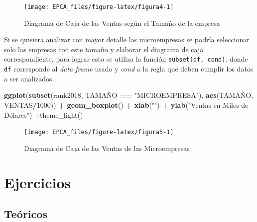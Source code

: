 \documentclass[letterpaper,]{book}
\newenvironment{Shaded}{\begin{snugshade}}{\end{snugshade}}
\newcommand{\DecValTok}[1]{\textcolor[rgb]{0.00,0.00,0.81}{#1}}
\newcommand{\KeywordTok}[1]{\textcolor[rgb]{0.13,0.29,0.53}{\textbf{#1}}}
\newcommand{\NormalTok}[1]{#1}
\newcommand{\OperatorTok}[1]{\textcolor[rgb]{0.81,0.36,0.00}{\textbf{#1}}}
\newcommand{\StringTok}[1]{\textcolor[rgb]{0.31,0.60,0.02}{#1}}
\begin{document}
\begin{figure}[h!]

{\centering \texttt{[image: EPCA\_files/figure-latex/figura4-1]} 

}

\caption{Diagrama de Caja de las Ventas según el Tamaño de la empresa}\label{fig:figura4}
\end{figure}

Si se quisiera analizar con mayor detalle las microempresas se podría seleccionar solo las empresas con este tamaño y elaborar el diagrama de caja correspondiente, para lograr esto se utiliza la función \texttt{subset(df,\ cond)}. donde \texttt{df} corresponde al \emph{data frame} usado y \emph{cond} a la regla que deben cumplir los datos a ser analizados.

\begin{Shaded}
\begin{Highlighting}[]
\KeywordTok{ggplot}\NormalTok{(}\KeywordTok{subset}\NormalTok{(rank2018, TAMAÑO }\OperatorTok{==}\StringTok{ "MICROEMPRESA"}\NormalTok{), }\KeywordTok{aes}\NormalTok{(TAMAÑO, VENTAS}\OperatorTok{/}\DecValTok{1000}\NormalTok{)) }\OperatorTok{+}\StringTok{ }
\StringTok{  }\KeywordTok{geom_boxplot}\NormalTok{() }\OperatorTok{+}\StringTok{ }\KeywordTok{xlab}\NormalTok{(}\StringTok{""}\NormalTok{) }\OperatorTok{+}
\StringTok{  }\KeywordTok{ylab}\NormalTok{(}\StringTok{"Ventas en Miles de Dólares") +theme_light()}
\end{Highlighting}
\end{Shaded}

\begin{figure}[h!]

{\centering \texttt{[image: EPCA\_files/figure-latex/figura5-1]} 

}

\caption{Diagrama de Caja de las Ventas de las Microempresas}\label{fig:figura5}
\end{figure}

\newpage

\hypertarget{ejercicios}{%
\section{Ejercicios}\label{ejercicios}}

\hypertarget{teoricos}{%
\subsection{Teóricos}\label{teoricos}}
\end{document}
